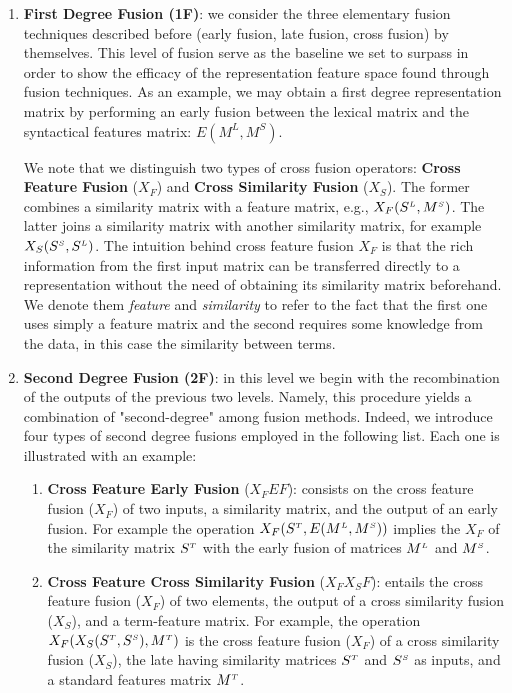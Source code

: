  \begin{enumerate}
\item \textbf{First Degree Fusion (1F)}: we  consider the  three elementary fusion techniques described before (early fusion, late fusion, cross fusion) by themselves.  This level of fusion serve as the baseline we set to surpass in order to show the efficacy of the representation feature space found through fusion techniques.
As an example, we may obtain a first degree representation matrix by performing an early fusion between the lexical matrix and the syntactical features matrix: $E(M^{L}, M^{S})$. 

We note that we distinguish two types of cross fusion operators: \textbf{Cross Feature Fusion} ($X_F$) and \textbf{Cross Similarity Fusion} ($X_S$). The former combines a similarity matrix with a feature matrix, e.g., $X_F(S^{\scriptscriptstyle L}, M^{\scriptscriptstyle S})$. The latter joins a similarity matrix with another similarity matrix, for example $X_S(S^{\scriptscriptstyle S}, S^{\scriptscriptstyle L})$. %
The intuition behind cross feature fusion $X_F$ is that the rich information from the first input matrix can be transferred directly to a representation without the need of obtaining its similarity matrix beforehand. We denote them \textit{feature} and \textit{similarity} to refer to the fact that the first one uses simply a feature matrix and the second requires some knowledge from the data, in this case the similarity between terms.

\item \textbf{Second Degree Fusion (2F)}: in this level we  begin with the recombination of the outputs of the previous two levels. Namely, this procedure  yields a combination of "second-degree" among fusion methods. Indeed, we introduce four types of second degree fusions employed in the following list. Each one is illustrated with an example:


\begin{enumerate}

\item \textbf{Cross Feature Early Fusion} ($X_FEF$): consists on the cross feature fusion ($X_F$) of two inputs, a similarity matrix, and the output of an early fusion. For example the operation $X_F(S^{\scriptscriptstyle T}, E(M^{\scriptscriptstyle L}, M^{\scriptscriptstyle S}))$ implies the $X_F$ of the similarity matrix $S^{\scriptscriptstyle T}$ with the early fusion of matrices $M^{\scriptscriptstyle L}$ and $M^{\scriptscriptstyle S}$.

\item \textbf{Cross Feature Cross Similarity Fusion} ($X_FX_SF$): entails the cross feature fusion ($X_F$) of two elements, the output of a cross similarity fusion ($X_S$), and a term-feature matrix. For example, the operation $X_F(X_S(S^{\scriptscriptstyle T}, S^{\scriptscriptstyle S}), M^{\scriptscriptstyle T})$ is the cross feature fusion ($X_F$) of a cross similarity fusion ($X_S$), the late having similarity matrices $S^{\scriptscriptstyle T}$ and $S^{\scriptscriptstyle S}$ as inputs, and a standard features matrix $M^{\scriptscriptstyle T}$.


\end{enumerate}
\end{enumerate}
